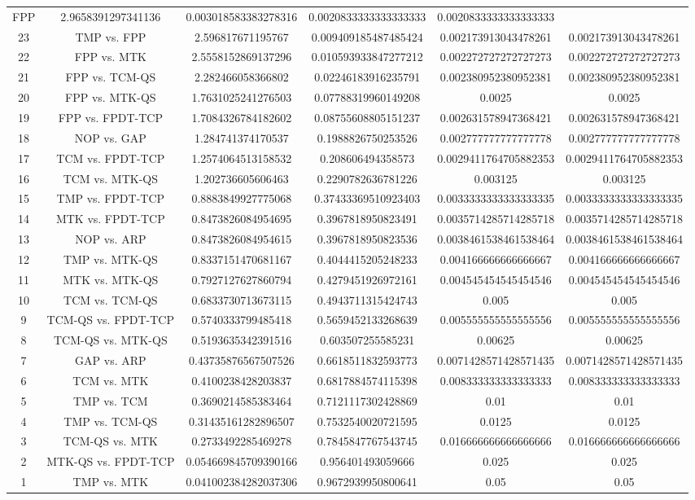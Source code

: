 \documentclass[a4paper,10pt]{article}
\begin{document}
\begin{landscape}
\begin{table}[!htp]
\begin{tabular}{cccccc}
FPP&2.9658391297341136&0.003018583383278316&0.0020833333333333333&0.0020833333333333333\\23&TMP vs. FPP&2.596817671195767&0.009409185487485424&0.002173913043478261&0.002173913043478261\\22&FPP vs. MTK&2.5558152869137296&0.010593933847277212&0.002272727272727273&0.002272727272727273\\21&FPP vs. TCM-QS&2.282466058366802&0.02246183916235791&0.002380952380952381&0.002380952380952381\\20&FPP vs. MTK-QS&1.7631025241276503&0.07788319960149208&0.0025&0.0025\\19&FPP vs. FPDT-TCP&1.7084326784182602&0.08755608805151237&0.002631578947368421&0.002631578947368421\\18&NOP vs. GAP&1.284741374170537&0.1988826750253526&0.002777777777777778&0.002777777777777778\\17&TCM vs. FPDT-TCP&1.2574064513158532&0.208606494358573&0.0029411764705882353&0.0029411764705882353\\16&TCM vs. MTK-QS&1.202736605606463&0.2290782636781226&0.003125&0.003125\\15&TMP vs. FPDT-TCP&0.8883849927775068&0.37433369510923403&0.0033333333333333335&0.0033333333333333335\\14&MTK vs. FPDT-TCP&0.8473826084954695&0.3967818950823491&0.0035714285714285718&0.0035714285714285718\\13&NOP vs. ARP&0.8473826084954615&0.3967818950823536&0.0038461538461538464&0.0038461538461538464\\12&TMP vs. MTK-QS&0.8337151470681167&0.4044415205248233&0.004166666666666667&0.004166666666666667\\11&MTK vs. MTK-QS&0.7927127627860794&0.4279451926972161&0.004545454545454546&0.004545454545454546\\10&TCM vs. TCM-QS&0.6833730713673115&0.4943711315424743&0.005&0.005\\9&TCM-QS vs. FPDT-TCP&0.5740333799485418&0.5659452133268639&0.005555555555555556&0.005555555555555556\\8&TCM-QS vs. MTK-QS&0.5193635342391516&0.603507255585231&0.00625&0.00625\\7&GAP vs. ARP&0.43735876567507526&0.6618511832593773&0.0071428571428571435&0.0071428571428571435\\6&TCM vs. MTK&0.4100238428203837&0.6817884574115398&0.008333333333333333&0.008333333333333333\\5&TMP vs. TCM&0.3690214585383464&0.7121117302428869&0.01&0.01\\4&TMP vs. TCM-QS&0.31435161282896507&0.7532540020721595&0.0125&0.0125\\3&TCM-QS vs. MTK&0.2733492285469278&0.7845847767543745&0.016666666666666666&0.016666666666666666\\2&MTK-QS vs. FPDT-TCP&0.054669845709390166&0.956401493059666&0.025&0.025\\1&TMP vs. MTK&0.041002384282037306&0.9672939950800641&0.05&0.05\\\hline

\end{tabular}
\end{table}
\end{landscape}
\end{document}
